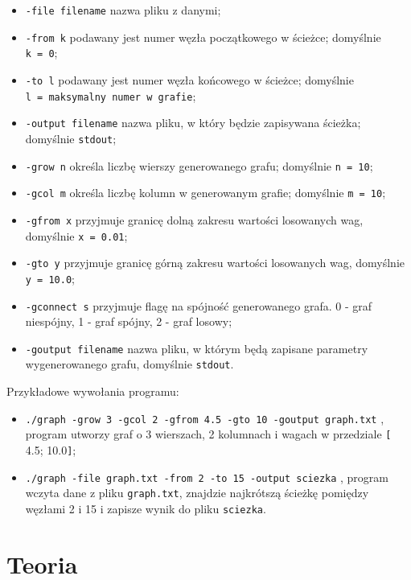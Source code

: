 \documentclass[]{article}
\begin{document}
\begin{itemize}
\item
  \texttt{-file\ filename} nazwa pliku z danymi;
\item
  \texttt{-from\ k} podawany jest numer węzła początkowego w ścieżce; domyślnie \texttt{k\ =\ 0};
\item
  \texttt{-to\ l} podawany jest numer węzła końcowego w ścieżce; domyślnie \texttt{l\ =\ maksymalny numer w grafie};
\item
  \texttt{-output\ filename} nazwa pliku, w który będzie zapisywana ścieżka; domyślnie \texttt{stdout};
\item
  \texttt{-grow\ n} określa liczbę wierszy generowanego grafu; domyślnie \texttt{n\ =\ 10};
\item
  \texttt{-gcol\ m} określa liczbę kolumn w generowanym grafie; domyślnie \texttt{m\ =\ 10};
\item
  \texttt{-gfrom\ x} przyjmuje granicę dolną zakresu wartości losowanych wag, domyślnie \texttt{x\ =\ 0.01};
\item
  \texttt{-gto\ y} przyjmuje granicę górną zakresu wartości losowanych wag, domyślnie \texttt{y\ =\ 10.0};
\item
  \texttt{-gconnect\ s} przyjmuje flagę na spójność generowanego grafa. 0 - graf niespójny, 1 - graf spójny, 2 - graf losowy;
\item
  \texttt{-goutput\ filename} nazwa pliku, w którym będą zapisane parametry wygenerowanego grafu, domyślnie \texttt{stdout}.
\end{itemize}

Przykładowe wywołania programu:

\begin{itemize}
\item
  \texttt{./graph\ -grow\ 3\ -gcol\ 2\ -gfrom\ 4.5\ -gto\ 10\ -goutput\ graph.txt}
  , program utworzy graf o 3 wierszach, 2 kolumnach i wagach w przedziale \texttt{[} 4.5; 10.0\texttt{]};
\item
  \texttt{./graph\ -file\ graph.txt\ -from\ 2\ -to\ 15\ -output\ sciezka}
  , program wczyta dane z pliku \texttt{graph.txt}, znajdzie najkrótszą ścieżkę pomiędzy węzłami 2 i 15 i zapisze wynik do pliku \texttt{sciezka}. 
\end{itemize}

\section{Teoria}\label{header-n279}
\end{document}
